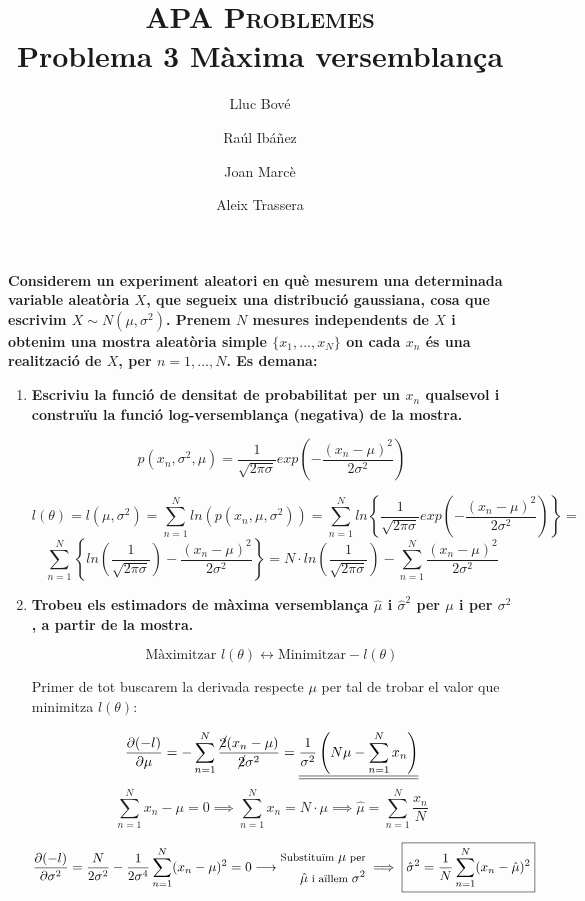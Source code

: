 \documentclass[a4paper]{article}
\title{\textsc{APA Problemes} \\ Problema 3 Màxima versemblança}
\author{Lluc Bové \and Raúl Ibáñez \and Joan Marcè \and Aleix Trassera}
\date{}
\begin{document}
\maketitle

\textbf{Considerem un experiment aleatori en què mesurem una determinada variable aleatòria $X$, que segueix una distribució gaussiana, cosa que escrivim $X \sim N(\mu, \sigma^2)$. Prenem $N$ mesures independents de $X$ i obtenim una mostra aleatòria simple $\{x_1, ..., x_N\}$ on cada $x_n$ és una realització de $X$, per $n=1,...,N$. Es demana:}

\begin{enumerate}
\item \textbf{Escriviu la funció de densitat de probabilitat per un $x_n$ qualsevol i construïu la funció log-versemblança (negativa) de la mostra.}

$$p(x_n, \sigma^2, \mu) = \frac{1}{\sqrt{2\pi\sigma}} exp\left(-\frac{(x_n - \mu)^2}{2\sigma^2}\right)$$

$$ 
l(\theta) = l(\mu,\sigma^2) = \sum_{n=1}^N ln(p(x_n, \mu, \sigma^2)) = 
\sum_{n=1}^N ln \left\{\frac{1}{\sqrt{2\pi\sigma}} exp\left(-\frac{(x_n - \mu)^2}{2\sigma^2}\right)\right\} =
$$
$$
\sum_{n=1}^N \left\{ ln \left(\frac{1}{\sqrt{2\pi\sigma}}\right) - \frac{(x_n - \mu)^2}{2\sigma^2} \right\} =
\boxed{N·ln \left(\frac{1}{\sqrt{2\pi\sigma}}\right) - \sum_{n=1}^N \frac{(x_n - \mu)^2}{2\sigma^2}}
$$

\item \textbf{Trobeu els estimadors de màxima versemblança $\hat{\mu}$ i $\hat{\sigma}^2$ per $\mu$ i per $\sigma^2$, a partir de la mostra.}

$$\text{Màximitzar } l(\theta) \leftrightarrow \text{Minimitzar} -l(\theta)$$

Primer de tot buscarem la derivada respecte $\mu$ per tal de trobar el valor que minimitza $l(\theta)$:

$$ 
\frac{\partial(-l)}{\partial\mu} = -\sum_{n=1}^N \frac{\cancel{2}(x_n - \mu)}{\cancel{2}\sigma^2} = 
\underline{\underline{\frac{1}{\sigma^2} \left(N\mu - \sum_{n=1}^N x_n \right)}}
$$
$$
\sum_{n=1}^N x_n - \mu = 0 \implies \sum_{n=1}^N x_n = N·\mu \implies 
\boxed{\hat{\mu} = \sum_{n=1}^N \frac{x_n}{N}}
$$ 

$$
\frac{\partial(-l)}{\partial\sigma^2} = \frac{N}{2\sigma^2} - \frac{1}{2\sigma^4}\sum_{n=1}^N (x_n - \mu)^2 = 0 \longrightarrow
\begin{aligned}
\footnotesize
\text{Substituïm } \mu \text{ per}\\
\footnotesize
\hat{\mu} \text{ i aïllem } \sigma^2 
\end{aligned} 
\implies \boxed{\hat{\sigma}^2 = \frac{1}{N} \sum_{n=1}^N (x_n - \hat{\mu})^2} 
$$


\end{enumerate}
\end{document}
